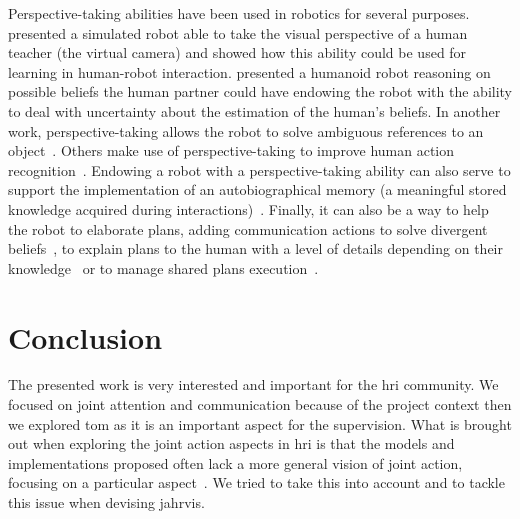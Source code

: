 \documentclass[a4paper,11pt,twoside]{StyleThese}
\begin{document}
Perspective-taking abilities have been used in robotics for several purposes. \cite{berlin_2006_perspective} presented a simulated robot able to take the visual perspective of a human teacher (the virtual camera) and showed how this ability could be used for learning in human-robot interaction. \cite{hiatt_2011_accommodating} presented a humanoid robot reasoning on possible beliefs the human partner could have endowing the robot with the ability to deal with uncertainty about the estimation of the human's beliefs. In another work, perspective-taking allows the robot to solve ambiguous references to an object~\citep{ros_2010_solving}. Others make use of perspective-taking to improve human action recognition~\citep{johnson_2005_perceptual}. Endowing a robot with a perspective-taking ability can also serve to support the implementation of an autobiographical memory (a meaningful stored knowledge acquired during interactions)~\citep{pointeau_2017_role}. Finally, it can also be a way to help the robot to elaborate plans, adding communication actions to solve divergent beliefs~\citep{warnier_2012_robot}, to explain plans to the human with a level of details depending on their knowledge~\citep{milliez_2016_using} or to manage shared plans execution~\citep{devin_2016_implemented}.

\section{Conclusion}

The presented work is very interested and important for the \acrshort{hri} community. We focused on joint attention and communication because of the project context then we explored \acrshort{tom} as it is an important aspect for the supervision. What is brought out when exploring the joint action aspects in \acrshort{hri} is that the models and implementations proposed often lack a more general vision of joint action, focusing on a particular aspect~\citep{belhassein_2020_horizontal}. We tried to take this into account and to tackle this issue when devising \acrshort{jahrvis}.
 
\end{document}
